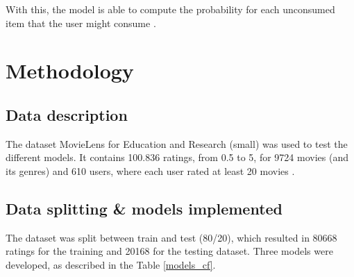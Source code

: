 \documentclass[conference]{IEEEtran}
\begin{document}
With this, the model is able to compute the probability for each unconsumed item that the user might consume \cite{gopalan2014scalablerecommendationpoissonfactorization}.

\section{Methodology}

\subsection{Data description}

The dataset MovieLens for Education and Research (small) was used to test the different models. It contains 100.836 ratings, from 0.5 to 5, for 9724 movies (and its genres) and 610 users, where each user rated at least 20 movies \cite{MovieLens}.

\subsection{Data splitting \& models implemented}

The dataset was split between train and test (80/20), which resulted in 80668 ratings for the training and 20168 for the testing dataset. Three models were developed, as described in the Table \ref{models_cf}.

\begin{table}[H]
\centering
\caption{Implemented models description.}
\label{models_cf}
\end{table}
\end{document}
